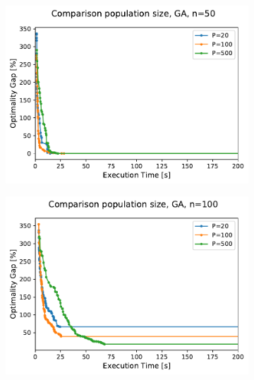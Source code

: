 \documentclass[12pt]{article}
\begin{document}
\begin{table}
{\begin{tabular}{llr|rrrr|rrrr}
\bottomrule
\end{tabular}%
}
\end{table}


  \begin{figure}
        \centering
        \begin{subfigure}[b]{0.475\textwidth}
            \centering
            \includegraphics[width=\textwidth]{figures/ga_50_population_comparison.pdf}
            \caption%
            {{\small }}    
            \label{fig:mean and std of net14}
        \end{subfigure}
        \hfill
        \begin{subfigure}[b]{0.475\textwidth}  
            \centering 
            \includegraphics[width=\textwidth]{figures/ga_100_population_comparison.pdf}

\end{subfigure}
\end{figure}
\end{document}
